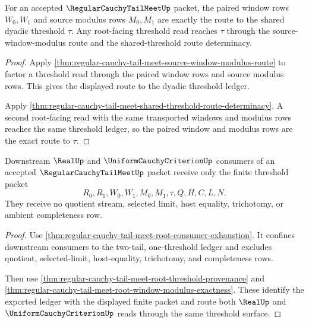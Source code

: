 \begin{theorem}
\label{thm:regular-cauchy-tail-meet-root-window-modulus-exactness}
For an accepted $\RegularCauchyTailMeetUp$ packet, the paired window rows $W_0,W_1$ and source modulus rows $M_0,M_1$ are exactly the route to the shared dyadic threshold $\tau$. Any root-facing threshold read reaches $\tau$ through the source-window-modulus route and the shared-threshold route determinacy.
\end{theorem}
\begin{proof}
Apply \autoref{thm:regular-cauchy-tail-meet-source-window-modulus-route} to factor a threshold read through the paired window rows and source modulus rows. This gives the displayed route to the dyadic threshold ledger.

Apply \autoref{thm:regular-cauchy-tail-meet-shared-threshold-route-determinacy}. A second root-facing read with the same transported windows and modulus rows reaches the same threshold ledger, so the paired window and modulus rows are the exact route to $\tau$.
\end{proof}

\begin{theorem}
\label{thm:regular-cauchy-tail-meet-root-consumer-export-boundary}
Downstream $\RealUp$ and $\UniformCauchyCriterionUp$ consumers of an accepted $\RegularCauchyTailMeetUp$ packet receive only the finite threshold packet
$$
R_0,R_1,W_0,W_1,M_0,M_1,\tau,Q,H,C,L,N.
$$
They receive no quotient stream, selected limit, host equality, trichotomy, or ambient completeness row.
\end{theorem}
\begin{proof}
Use \autoref{thm:regular-cauchy-tail-meet-root-consumer-exhaustion}. It confines downstream consumers to the two-tail, one-threshold ledger and excludes quotient, selected-limit, host-equality, trichotomy, and completeness rows.

Then use \autoref{thm:regular-cauchy-tail-meet-root-threshold-provenance} and \autoref{thm:regular-cauchy-tail-meet-root-window-modulus-exactness}. These identify the exported ledger with the displayed finite packet and route both $\RealUp$ and $\UniformCauchyCriterionUp$ reads through the same threshold surface.
\end{proof}

